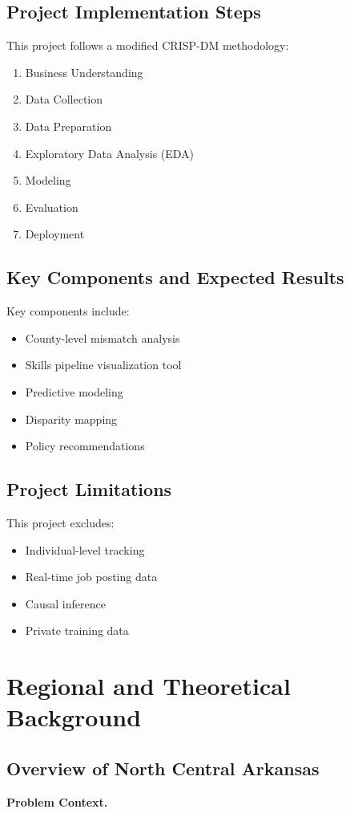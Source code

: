 \documentclass[12pt]{article}
\begin{document}
\subsection{Project Implementation Steps}
This project follows a modified CRISP-DM methodology:
\begin{enumerate}[label=\arabic*.]
  \item Business Understanding
  \item Data Collection
  \item Data Preparation
  \item Exploratory Data Analysis (EDA)
  \item Modeling
  \item Evaluation
  \item Deployment
\end{enumerate}

\subsection{Key Components and Expected Results}
Key components include:
\begin{itemize}
  \item County-level mismatch analysis
  \item Skills pipeline visualization tool
  \item Predictive modeling
  \item Disparity mapping
  \item Policy recommendations
\end{itemize}

\subsection{Project Limitations}
This project excludes:
\begin{itemize}
  \item Individual-level tracking
  \item Real-time job posting data
  \item Causal inference
  \item Private training data
\end{itemize}

\section{Regional and Theoretical Background}

\subsection{Overview of North Central Arkansas}
\textbf{Problem Context.}  
\end{document}
